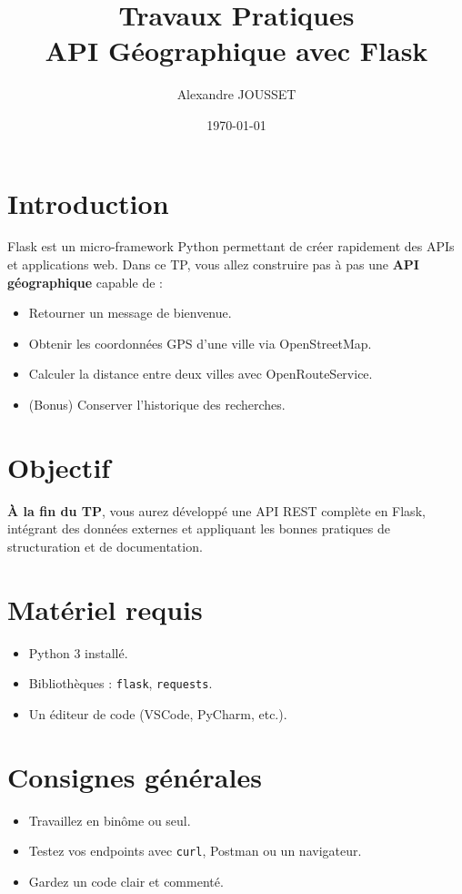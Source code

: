 \documentclass[a4paper,12pt]{article}
\title{Travaux Pratiques \\ API Géographique avec Flask}
\author{Alexandre JOUSSET}
\date{\today}
\begin{document}
\maketitle

\section*{Introduction}

Flask est un micro-framework Python permettant de créer rapidement des APIs et applications web.  
Dans ce TP, vous allez construire pas à pas une \textbf{API géographique} capable de :
\begin{itemize}
    \item Retourner un message de bienvenue.
    \item Obtenir les coordonnées GPS d’une ville via OpenStreetMap.
    \item Calculer la distance entre deux villes avec OpenRouteService.
    \item (Bonus) Conserver l’historique des recherches.
\end{itemize}

\section*{Objectif}

\textbf{À la fin du TP}, vous aurez développé une API REST complète en Flask, intégrant des données externes et appliquant les bonnes pratiques de structuration et de documentation.

\section*{Matériel requis}

\begin{itemize}
    \item Python 3 installé.
    \item Bibliothèques : \texttt{flask}, \texttt{requests}.
    \item Un éditeur de code (VSCode, PyCharm, etc.).
\end{itemize}

\section*{Consignes générales}

\begin{itemize}
    \item Travaillez en binôme ou seul.
    \item Testez vos endpoints avec \texttt{curl}, Postman ou un navigateur.
    \item Gardez un code clair et commenté.
\end{itemize}
\end{document}
